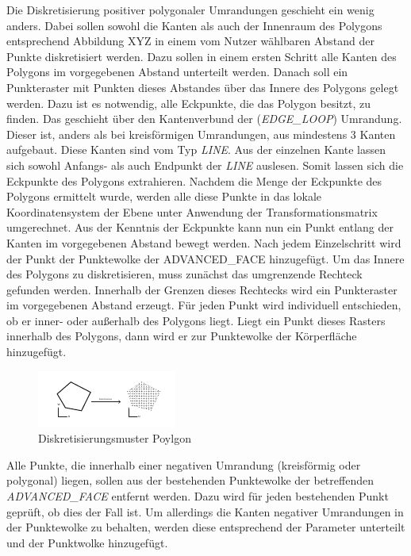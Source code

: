 Die Diskretisierung positiver polygonaler Umrandungen geschieht ein wenig anders. Dabei sollen sowohl die Kanten als auch der Innenraum des Polygons entsprechend Abbildung XYZ in einem vom Nutzer wählbaren Abstand der Punkte  diskretisiert werden. Dazu sollen in einem ersten Schritt alle Kanten des Polygons im vorgegebenen Abstand unterteilt werden. Danach soll ein Punkteraster mit Punkten dieses Abstandes über das Innere des Polygons gelegt werden. Dazu ist es notwendig, alle Eckpunkte, die das Polygon besitzt, zu finden. Das geschieht über den Kantenverbund der (\textit{EDGE\_LOOP}) Umrandung. Dieser ist, anders als bei kreisförmigen Umrandungen, aus mindestens 3 Kanten aufgebaut. Diese Kanten sind vom Typ \textit{LINE}. Aus der einzelnen Kante lassen sich sowohl Anfangs- als auch Endpunkt der \textit{LINE} auslesen. Somit lassen sich die Eckpunkte des Polygons extrahieren. Nachdem die Menge der Eckpunkte des Polygons ermittelt wurde, werden alle diese Punkte in das lokale Koordinatensystem der Ebene unter Anwendung der Transformationsmatrix umgerechnet.
Aus der Kenntnis der Eckpunkte kann nun ein Punkt entlang der Kanten im vorgegebenen Abstand bewegt werden. Nach jedem Einzelschritt wird der Punkt der Punktewolke der ADVANCED\_FACE hinzugefügt. 
Um das Innere des Polygons zu diskretisieren, muss zunächst das umgrenzende Rechteck gefunden werden. Innerhalb der Grenzen dieses Rechtecks wird ein Punkteraster im vorgegebenen Abstand erzeugt. Für jeden Punkt wird individuell entschieden, ob er inner- oder außerhalb des Polygons liegt. Liegt ein Punkt dieses Rasters innerhalb des Polygons, dann wird er zur Punktewolke der Körperfläche hinzugefügt.  

\begin{figure}[h]
	\centering
	
	\includegraphics[width=0.7\linewidth]{img/discretpolygon.pdf}
	
	\caption{Diskretisierungsmuster Poylgon}
	\label{fig:discretpolygon}
	
\end{figure}

Alle Punkte, die innerhalb einer negativen Umrandung (kreisförmig oder polygonal) liegen, sollen aus der bestehenden Punktewolke der betreffenden \textit{ADVANCED\_FACE} entfernt werden. Dazu wird für jeden bestehenden Punkt geprüft, ob dies der Fall ist. Um allerdings die Kanten negativer Umrandungen in der Punktewolke zu behalten, werden diese entsprechend der Parameter unterteilt und der Punktwolke hinzugefügt.

